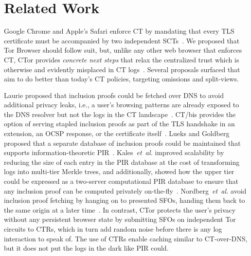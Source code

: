 \section{Related Work} \label{sec:related}
Google Chrome and Apple's Safari enforce CT by mandating that every TLS
certificate must be accompanied by two independent
SCTs~\cite{chrome-policy,safari-policy}.  We proposed that Tor Browser should
follow suit, but, unlike any other web browser that enforces CT, CTor provides
\emph{concrete next steps} that relax the centralized trust which is otherwise
and evidently misplaced in CT logs~\cite{%
	izenpe-disqualified,%
	venafi-disqualified,%
	gdca1-omission,%
	digicert-log-compromised%
}.  Several proposals surfaced that aim to do better than today's CT
policies, targeting omissions and split-views.

Laurie proposed that inclusion proofs could be fetched over DNS to avoid
additional privacy leaks, i.e., a user's browsing patterns are already exposed
to the DNS resolver but not the logs in the CT landscape~\cite{ct-over-dns}.
CT/bis provides the option of serving stapled inclusion proofs as part of the
TLS handshake in an extension, an OCSP response, or the certificate
itself~\cite{ct/bis}.
Lueks and Goldberg proposed that a separate database of inclusion proofs could
be maintained that supports information-theoretic PIR~\cite{lueks-and-goldberg}.
Kales~\emph{et~al.} improved scalability by reducing the size of each entry
in the PIR database at the cost of transforming logs into multi-tier Merkle
trees, and additionally, showed how the upper tier could be expressed as
a two-server computational PIR database to ensure that any inclusion proof can
be computed privately on-the-fly~\cite{kales}.
Nordberg~\emph{et~al.} avoid inclusion proof fetching by hanging on to presented
SFOs, handing them back to the same origin at a later time~\cite{nordberg}.
In contrast, CTor protects the user's privacy without any persistent browser state
by submitting SFOs on independent Tor circuits to CTRs, which in turn add random
noise before there is any log interaction to speak of.  The use of CTRs
enable caching similar to CT-over-DNS, but it does not put the logs in the dark
like PIR could.

